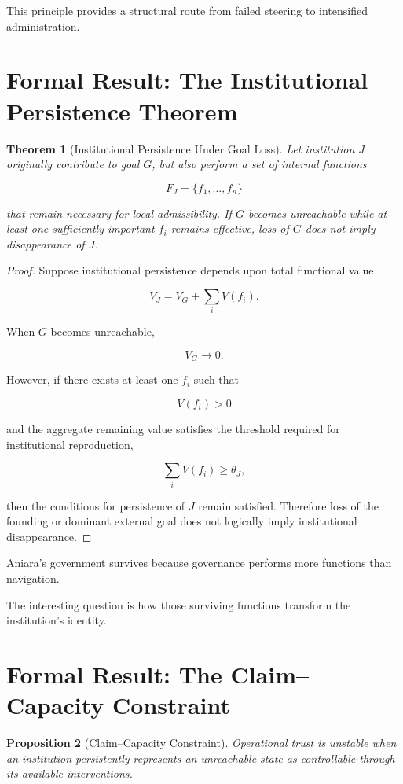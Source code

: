 \documentclass[11pt,oneside]{book}
\newtheorem{theorem}{Theorem}[chapter]
\newtheorem{proposition}[theorem]{Proposition}
\theoremstyle{definition}
\theoremstyle{remark}
\begin{document}
This principle provides a structural route from failed steering to intensified administration.

\section{Formal Result: The Institutional Persistence Theorem}

\begin{theorem}[Institutional Persistence Under Goal Loss]
Let institution \(J\) originally contribute to goal \(G\), but also perform a set of internal functions

\[
F_J=\{f_1,\ldots,f_n\}
\]

that remain necessary for local admissibility. If \(G\) becomes unreachable while at least one sufficiently important \(f_i\) remains effective, loss of \(G\) does not imply disappearance of \(J\).
\end{theorem}

\begin{proof}
Suppose institutional persistence depends upon total functional value

\[
V_J
=
V_G
+
\sum_iV(f_i).
\]

When \(G\) becomes unreachable,

\[
V_G\rightarrow0.
\]

However, if there exists at least one \(f_i\) such that

\[
V(f_i)>0
\]

and the aggregate remaining value satisfies the threshold required for institutional reproduction,

\[
\sum_iV(f_i)\geq\theta_J,
\]

then the conditions for persistence of \(J\) remain satisfied. Therefore loss of the founding or dominant external goal does not logically imply institutional disappearance.
\end{proof}

Aniara's government survives because governance performs more functions than navigation.

The interesting question is how those surviving functions transform the institution's identity.

\section{Formal Result: The Claim--Capacity Constraint}

\begin{proposition}[Claim--Capacity Constraint]
Operational trust is unstable when an institution persistently represents an unreachable state as controllable through its available interventions.
\end{proposition}
\end{document}
